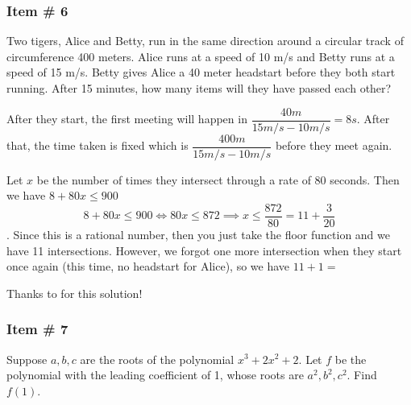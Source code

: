 \documentclass[11pt,paper=letter]{scrartcl}
\begin{document}
\subsubsection{Item \# 6}

\begin{probboxed}
Two tigers, Alice and Betty, run in the same direction around a circular track of circumference 400 meters. Alice runs at a speed of 10 m/s and Betty runs at a speed of 15 m/s. Betty gives Alice a 40 meter headstart before they both start running. After 15 minutes, how many items will they have passed each other?


\end{probboxed}


\sol After they start, the first meeting will happen in $\dfrac{40m }{15m/s - 10m/s}= 8s$. After that, the time taken is fixed which is $\dfrac{400m}{15m/s - 10m/s}$ before they meet again.

\vspace{2mm}

Let $x$ be the number of times they intersect through a rate of 80 seconds. Then we have $8 + 80x \leq 900$ $$8 + 80x \leq 900 \Leftrightarrow 80x \leq872 \implies x \leq \dfrac{872}{80} = 11 + \dfrac{3}{20}  $$. Since this is a rational number, then you just take the floor function and we have 11 intersections. However, we forgot one more intersection when they start once again (this time, no headstart for Alice), so we have $11 + 1 =$ 


\begin{mdframed}
\begin{rem}
Thanks to  for this solution!
\end{rem}
\end{mdframed}


\subsubsection{Item \# 7}

\begin{probboxed}
Suppose $a,b,c$ are the roots of the polynomial $x^3 +2x^2 + 2$. Let $f$ be the polynomial with the leading coefficient of 1, whose roots are $a^2, b^2, c^2$. Find $f(1).$
   
\end{probboxed}
\end{document}
